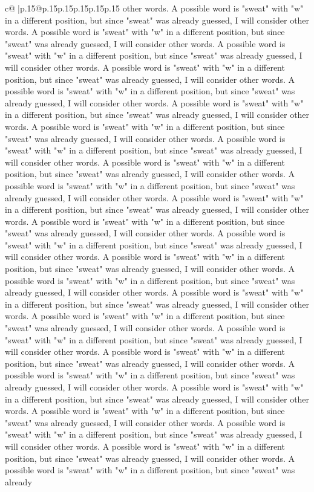 \documentclass{article}
\begin{document}
{\begin{supertabular}{c@{$\;$}|p{.15\linewidth}@{}p{.15\linewidth}p{.15\linewidth}p{.15\linewidth}p{.15\linewidth}p{.15\linewidth}}
{{{other words. A possible word is "sweat" with "w" in a different position, but since "sweat" was already guessed, I will consider other words. A possible word is "sweat" with "w" in a different position, but since "sweat" was already guessed, I will consider other words. A possible word is "sweat" with "w" in a different position, but since "sweat" was already guessed, I will consider other words. A possible word is "sweat" with "w" in a different position, but since "sweat" was already guessed, I will consider other words. A possible word is "sweat" with "w" in a different position, but since "sweat" was already guessed, I will consider other words. A possible word is "sweat" with "w" in a different position, but since "sweat" was already guessed, I will consider other words. A possible word is "sweat" with "w" in a different position, but since "sweat" was already guessed, I will consider other words. A possible word is "sweat" with "w" in a different position, but since "sweat" was already guessed, I will consider other words. A possible word is "sweat" with "w" in a different position, but since "sweat" was already guessed, I will consider other words. A possible word is "sweat" with "w" in a different position, but since "sweat" was already guessed, I will consider other words. A possible word is "sweat" with "w" in a different position, but since "sweat" was already guessed, I will consider other words. A possible word is "sweat" with "w" in a different position, but since "sweat" was already guessed, I will consider other words. A possible word is "sweat" with "w" in a different position, but since "sweat" was already guessed, I will consider other words. A possible word is "sweat" with "w" in a different position, but since "sweat" was already guessed, I will consider other words. A possible word is "sweat" with "w" in a different position, but since "sweat" was already guessed, I will consider other words. A possible word is "sweat" with "w" in a different position, but since "sweat" was already guessed, I will consider other words. A possible word is "sweat" with "w" in a different position, but since "sweat" was already guessed, I will consider other words. A possible word is "sweat" with "w" in a different position, but since "sweat" was already guessed, I will consider other words. A possible word is "sweat" with "w" in a different position, but since "sweat" was already guessed, I will consider other words. A possible word is "sweat" with "w" in a different position, but since "sweat" was already guessed, I will consider other words. A possible word is "sweat" with "w" in a different position, but since "sweat" was already guessed, I will consider other words. A possible word is "sweat" with "w" in a different position, but since "sweat" was already guessed, I will consider other words. A possible word is "sweat" with "w" in a different position, but since "sweat" was already guessed, I will consider other words. A possible word is "sweat" with "w" in a different position, but since "sweat" was already guessed, I will consider other words. A possible word is "sweat" with "w" in a different position, but since "sweat" was already }}}
\end{supertabular}}
\end{document}
